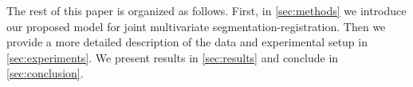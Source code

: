 The rest of this paper is organized as follows.
First, in \autoref{sec:methods}
we introduce our proposed model for joint multivariate segmentation-registration.
Then we provide a more detailed description of the data and experimental setup in
\autoref{sec:experiments}.
We present results in \autoref{sec:results} and conclude
in \autoref{sec:conclusion}.